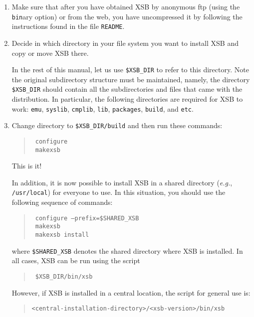 \begin{enumerate}
\item   Make sure that after you have obtained XSB by anonymous ftp 
	(using the {\tt bin}ary option) or from the web, you have
	uncompressed it by following the instructions found in the
	file {\tt README}.

\item	Decide in which directory in your file system you want to
	install XSB and copy or move XSB there.

	In the rest of this manual, let us use {\tt \$XSB\_DIR}  to
	refer to this directory.  Note the original subdirectory
	structure must be maintained, namely, the directory
	{\tt \$XSB\_DIR}  should contain all the subdirectories and files
	that came with the distribution. In particular, the following
	directories are required for XSB to work:
	\verb'emu', \verb'syslib', \verb'cmplib', 
	\verb'lib', \verb'packages', \verb'build', and \verb'etc'.


\item Change directory to {\tt \$XSB\_DIR/build} and then run these commands:
  \begin{quote}
    \tt
    configure\\
    \tt
    makexsb
  \end{quote}
  This is it!
  
  In addition, it is now possible to install XSB in a shared directory
  ({\it e.g.}, {\tt /usr/local}) for everyone to use.  In this situation,
  you should use the following sequence of commands:
  \begin{quote}
    \tt
    configure --prefix=\$SHARED\_XSB\\
    \tt
    makexsb\\
    \tt
    makexsb install
  \end{quote}
  where {\tt \$SHARED\_XSB}  denotes the shared directory where XSB is
  installed.  In all cases, XSB can be run using the script
  \begin{quote}
    \tt
    \$XSB\_DIR/bin/xsb
  \end{quote}
  However, if XSB is installed in a central location, the script for
  general use is:
  \begin{quote}
    \verb'<central-installation-directory>/<xsb-version>/bin/xsb'
  \end{quote}
\end{enumerate}

